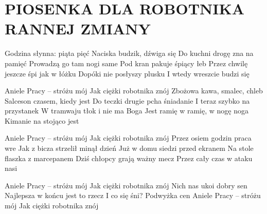 \documentclass[../../../songbook.tex]{subfiles}
\begin{document}
\TabPositions{8cm} %
\section*{PIOSENKA DLA ROBOTNIKA RANNEJ ZMIANY}
{}
\vspace{0.5cm}
Godzina słynna: piąta pięć 				 \newline
Naciska budzik, dźwiga się \newline
Do kuchni drogę zna na pamięć \newline
Prowadzą go tam nogi same 				 \newline
Pod kran pakuje śpiący łeb 				 \newline
Przez chwilę jeszcze śpi jak w łóżku	 \newline
Dopóki nie posłyszy plusku 				 \newline
I wtedy wreszcie budzi się 				 \newline

Aniele Pracy – stróżu mój \newline
Jak ciężki robotnika znój \newline
Zbożowa kawa, smalec, chleb \newline
Salceson czasem, kiedy jest \newline
Do teczki drugie pcha śniadanie \newline
I teraz szybko na przystanek \newline
W tramwaju tłok i nie ma Boga \newline
Jest ramię w ramię, w nogę noga \newline
Kimanie na stojąco jest \newline

Aniele Pracy – stróżu mój \newline
Jak ciężki robotnika znój \newline
Przez osiem godzin praca wre \newline
Jak z bicza strzelił minął dzień \newline
Już w domu siedzi przed ekranem \newline
Na stole flaszka z marcepanem \newline
Dziś chłopcy grają ważny mecz \newline
Przez cały czas w ataku nasi \newline

Aniele Pracy – stróżu mój \newline
Jak ciężki robotnika znój \newline
Nich nas ukoi dobry sen \newline
Najlepsza w końcu jest to rzecz \newline
I co się śni? Podwyżka cen \newline
Aniele Pracy – stróżu mój \newline
Jak ciężki robotnika znój \newline
\end{document}
